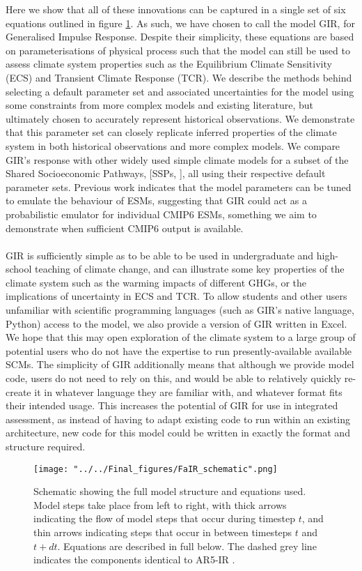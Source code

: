 \documentclass[gmd, manuscript]{copernicus}
\begin{document}
Here we show that all of these innovations can be captured in a single set of six equations outlined in figure \ref{fig:schematic}. As such, we have chosen to call the model GIR, for Generalised Impulse Response. Despite their simplicity, these equations are based on parameterisations of physical process such that the model can still be used to assess climate system properties such as the Equilibrium Climate Sensitivity (ECS) and Transient Climate Response (TCR). We describe the methods behind selecting a default parameter set and associated uncertainties for the model using some constraints from more complex models and existing literature, but ultimately chosen to accurately represent historical observations. We demonstrate that this parameter set can closely replicate inferred properties of the climate system in both historical observations and more complex models. We compare GIR’s response with other widely used simple climate models for a subset of the Shared Socioeconomic Pathways, [SSPs, \cite{Riahi2017}], all using their respective default parameter sets. Previous work \citep{Joos2013,Tsutsui2017} indicates that the model parameters can be tuned to emulate the behaviour of ESMs, suggesting that GIR could act as a probabilistic emulator for individual CMIP6 ESMs, something we aim to demonstrate when sufficient CMIP6 output is available.\\\\
GIR is sufficiently simple as to be able to be used in undergraduate and high-school teaching of climate change, and can illustrate some key properties of the climate system such as the warming impacts of different GHGs, or the implications of uncertainty in ECS and TCR. To allow students and other users unfamiliar with scientific programming languages (such as GIR's native language, Python) access to the model, we also provide a version of GIR written in Excel. We hope that this may open exploration of the climate system to a large group of potential users who do not have the expertise to run presently-available available SCMs. The simplicity of GIR additionally means that although we provide model code, users do not need to rely on this, and would be able to relatively quickly re-create it in whatever language they are familiar with, and whatever format fits their intended usage. This increases the potential of GIR for use in integrated assessment, as instead of having to adapt existing code to run within an existing architecture, new code for this model could be written in exactly the format and structure required.
\begin{figure}[t]
\texttt{[image: "../../Final\_figures/FaIR\_schematic".png]}
\caption{Schematic showing the full model structure and equations used. Model steps take place from left to right, with thick arrows indicating the flow of model steps that occur during timestep $t$, and thin arrows indicating steps that occur in between timesteps $t$ and $t+dt$. Equations are described in full below. The dashed grey line indicates the components identical to AR5-IR \citep{Myhre2013a}.}
\label{fig:schematic}
\end{figure}
\end{document}
